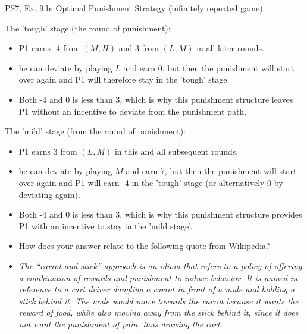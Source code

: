 \begin{frame}{PS7, Ex. 9.b: Optimal Punishment Strategy (infinitely repeated game)}
  \begin{multicols}{2}
    The 'tough' stage (the  round of punishment):\vspace{-4pt}
    \begin{itemize}
      \item P1 earns -4 from $(M, H)$ and 3 from $(L, M)$ in all later rounds.
      \item he can deviate by playing $L$ and earn 0, but then the punishment will start over again and P1 will therefore stay in the 'tough' stage.
      \item Both -4 and 0 is less than 3, which is why this punishment structure leaves P1 without an incentive to deviate from the punishment path.
    \end{itemize}
    \vfill\null\columnbreak
    The 'mild' stage (from the  round of punishment):\vspace{-4pt}
    \begin{itemize}
      \item P1 earns 3 from $(L, M)$ in this and all subsequent rounds.
      \item he can deviate by playing $M$ and earn 7, but then the punishment will start over again and P1 will earn -4 in the 'tough' stage (or alternatively 0 by deviating again).
      \item Both -4 and 0 is less than 3, which is why this punishment structure provides P1 with an incentive to stay in the 'mild stage'.
    \end{itemize}
    \vfill\null
  \end{multicols}
    \vspace{-24pt}
    \begin{itemize}
      \item[(b)] How does your answer relate to the following quote from Wikipedia?
      \item[] \textit{The “carrot and stick” approach is an idiom that refers to a policy of offering a combination of rewards and punishment to induce behavior. It is named in reference to a cart driver dangling a carrot in front of a mule and holding a stick behind it. The mule would move towards the carrot because it wants the reward of food, while also moving away from the stick behind it, since it does not want the punishment of pain, thus drawing the cart.}
    \end{itemize}
\end{frame}
